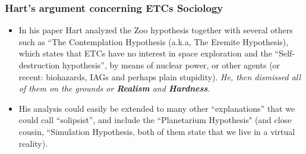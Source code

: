 \begin{frame}
\frametitle{Hart's argument concerning ETCs Sociology}
\begin{itemize}


\item In his paper Hart analyzed the Zoo hypothesis together with several others such as ``The Contemplation Hypothesis (a.k.a, The Eremite Hypothesis), which states that ETCs have no interest in space exploration and the  ``Self-destruction hypothesis'', by means of nuclear power, or other agents (or recent: biohazards, IAGs and perhaps plain stupidity).  {\em He, then dismissed all of them on the grounds or {\bf Realism} and {\bf Hardness}}. 
\item His analysis could easily be extended to many other ``explanations'' that we could call ``solipsist'', and include the ``Planetarium Hypothesis" (and close cousin, ``Simulation Hypothesis, both of them state that we live in a virtual reality). 
  
\end{itemize}
\end{frame}

%
%
%
%


